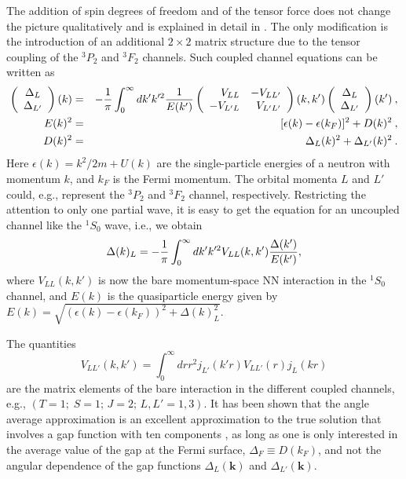 \documentclass[rmp,aps,floatfix]{revtex4}
\begin{document}
The addition of spin degrees of freedom and of the tensor force does not
change the picture qualitatively and is explained in detail 
in \cite{taka93,bls95}.
The only modification is the introduction 
of an additional $2\times2$ matrix structure due to the tensor coupling
of the $^3P_2$ and $^3F_2$ channels. Such coupled channel equations can
be written as 
\begin{eqnarray}
 \left( \begin{array}{c} \Delta_L \\ \Delta_{L'} \end{array} \right)(k) &=&
 - {1\over\pi} \int_0^\infty dk' k'^2 {1\over E(k')}
 \left( \begin{array}{rr}
  V_{LL} & -V_{LL'} \\ -V_{L'L} & V_{L'L'}
 \end{array} \right)(k,k')
 \left(\begin{array}{c} \Delta_L \\ \Delta_{L'} \end{array}\right)(k') \:,
\\
  E(k)^2 &=& [\epsilon(k)-\epsilon(k_F)]^2 + D(k)^2 \:,
\\
  D(k)^2 &=& \Delta_{L}(k)^2 + \Delta_{L'}(k)^2 \:.
\label{eq:gap2c}
\end{eqnarray}
Here $\epsilon(k)=k^2/2m + U(k)$ are the single-particle energies of a neutron with 
momentum $k$, and $k_F$ is the Fermi momentum. The orbital
momenta  $L$ and $L'$ could, e.g., represent the $^3P_2$ and $^3F_2$ channel,
respectively. Restricting the attention to only one partial wave,
it is easy to get the equation for an  uncoupled channel like the 
$^1S_0$ wave, i.e., we obtain
\begin{equation}
      \Delta(k)_L=-\frac{1}{\pi}\int_{0}^{\infty}dk'k'^2 
                 V_{LL}(k,k'){{\Delta(k')}\over{E(k')}},
       \label{eq:pairinggap2_sec2}
\end{equation}
where $V_{LL}(k,k')$ is now the bare momentum-space NN interaction in the 
$^1S_0$ channel, and $E(k)$ is the quasiparticle energy given by 
$E(k)=\sqrt{(\epsilon(k)-\epsilon(k_F))^2+\Delta(k)_L^2}$. 

The quantities 
\begin{equation}
  V_{LL'}(k,k') =  \int_0^\infty dr r^2 j_{L'}(k'r) V_{LL'}(r) j_L(kr)
\label{e:v}
\end{equation}
are the matrix elements of the bare interaction in 
the different coupled channels, e.g.,  
$(T=1;\;S=1;\,J=2;\,L,L'=1,3)$. 
It has been shown that the angle average approximation is an 
excellent approximation to the true solution that involves a gap function 
with ten components \cite{taka93,kkc96}, as long as one is 
only interested in the average value of the gap at the Fermi surface, 
$\Delta_F\equiv D(k_F)$, and not the angular dependence of the gap functions 
$\Delta_L(\bm{k})$ and $\Delta_{L'}(\bm{k})$.  
\end{document}

